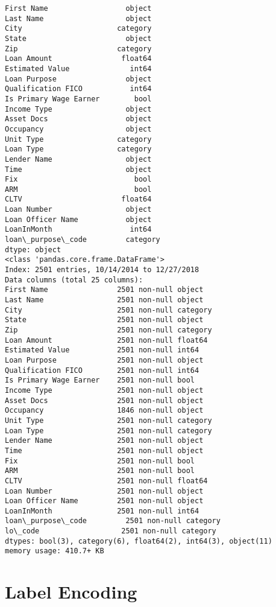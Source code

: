 \documentclass[11pt]{article}
\begin{document}
    \begin{Verbatim}[commandchars=\\\{\}]
First Name                  object
Last Name                   object
City                      category
State                       object
Zip                       category
Loan Amount                float64
Estimated Value              int64
Loan Purpose                object
Qualification FICO           int64
Is Primary Wage Earner        bool
Income Type                 object
Asset Docs                  object
Occupancy                   object
Unit Type                 category
Loan Type                 category
Lender Name                 object
Time                        object
Fix                           bool
ARM                           bool
CLTV                       float64
Loan Number                 object
Loan Officer Name           object
LoanInMonth                  int64
loan\_purpose\_code         category
dtype: object
<class 'pandas.core.frame.DataFrame'>
Index: 2501 entries, 10/14/2014 to 12/27/2018
Data columns (total 25 columns):
First Name                2501 non-null object
Last Name                 2501 non-null object
City                      2501 non-null category
State                     2501 non-null object
Zip                       2501 non-null category
Loan Amount               2501 non-null float64
Estimated Value           2501 non-null int64
Loan Purpose              2501 non-null object
Qualification FICO        2501 non-null int64
Is Primary Wage Earner    2501 non-null bool
Income Type               2501 non-null object
Asset Docs                2501 non-null object
Occupancy                 1846 non-null object
Unit Type                 2501 non-null category
Loan Type                 2501 non-null category
Lender Name               2501 non-null object
Time                      2501 non-null object
Fix                       2501 non-null bool
ARM                       2501 non-null bool
CLTV                      2501 non-null float64
Loan Number               2501 non-null object
Loan Officer Name         2501 non-null object
LoanInMonth               2501 non-null int64
loan\_purpose\_code         2501 non-null category
lo\_code                   2501 non-null category
dtypes: bool(3), category(6), float64(2), int64(3), object(11)
memory usage: 410.7+ KB

    \end{Verbatim}

    \section{Label Encoding}\label{label-encoding}
\end{document}

